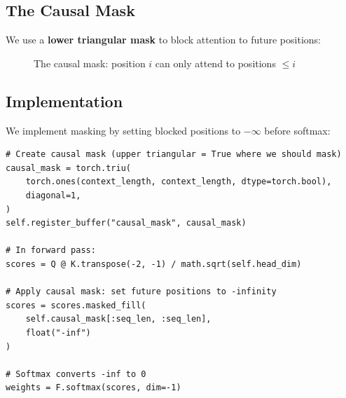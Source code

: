 \subsection{The Causal Mask}

We use a \textbf{lower triangular mask} to block attention to future positions:

\begin{figure}[H]
\centering
{}
\caption{The causal mask: position $i$ can only attend to positions $\leq i$}
\label{fig:causal-mask}
\end{figure}

\subsection{Implementation}

We implement masking by setting blocked positions to $-\infty$ before softmax:

\begin{lstlisting}[style=python, caption={Causal masking from model.py}]
# Create causal mask (upper triangular = True where we should mask)
causal_mask = torch.triu(
    torch.ones(context_length, context_length, dtype=torch.bool),
    diagonal=1,
)
self.register_buffer("causal_mask", causal_mask)

# In forward pass:
scores = Q @ K.transpose(-2, -1) / math.sqrt(self.head_dim)

# Apply causal mask: set future positions to -infinity
scores = scores.masked_fill(
    self.causal_mask[:seq_len, :seq_len],
    float("-inf")
)

# Softmax converts -inf to 0
weights = F.softmax(scores, dim=-1)
\end{lstlisting}


